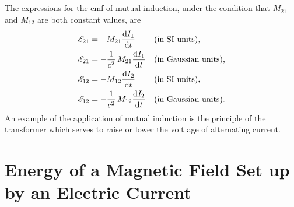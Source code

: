 \subsection{}\label{25.3.3} The expressions for the emf of mutual induction, under the condition that $M_{21}$ and $M_{12}$ are both constant values, are
\begin{align*}%
\emf_{21} & = - M_{21}\dv{I_{1}}{t} && \text{(in SI units),} \\
\emf_{21} & = - \frac{1}{c^{2}} \,M_{21}\dv{I_{1}}{t} &&  \text{(in Gaussian units),}\\
\emf_{12} & = - M_{12}\dv{I_{2}}{t} && \text{(in SI units),} \\
\emf_{12} & = - \frac{1}{c^{2}} \,M_{12}\dv{I_{2}}{t} &&  \text{(in Gaussian units).}
\end{align*}
An example of the application of mutual induction is the principle of the transformer which serves to raise or lower the volt­ age of alternating current.


\section[Energy of a Magnetic Field]{Energy of a Magnetic Field Set up by an Electric Current}
\label{sec-25.4}

